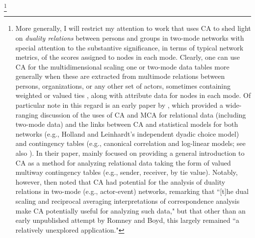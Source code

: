 \footnote{More generally, I will restrict my attention to work that uses CA to shed light on \textit{duality relations} between persons and groups in two-mode networks with special attention to the substantive significance, in terms of typical network metrics, of the scores assigned to nodes in each mode. Clearly, one can use CA for the multidimensional scaling one or two-mode data tables more generally when these are extracted from multimode relations between persons, organizations, or any other set of actors, sometimes containing weighted or valued ties \citep{ragozini2014correspondence}, along with attribute data for nodes in each mode. Of particular note in this regard is an early paper by \citet{wasserman1990correspondence}, which provided a wide-ranging discussion of the uses of CA and MCA for relational data (including two-mode data) and the links between CA and statistical models for both networks (e.g., Holland and Leinhardt's independent dyadic choice model) and contingency tables (e.g., canonical correlation and log-linear models; see also \citet{wasserman1989canonical}). In their paper, \citet{wasserman1990correspondence} mainly focused on providing a general introduction to CA as a method for analyzing relational data taking the form of valued multiway contingency tables (e.g., sender, receiver, by tie value). Notably, however, \citet[35]{wasserman1990correspondence} then noted that CA had potential for the analysis of duality relations in two-mode (e.g., actor-event) networks, remarking that ``[t]he dual scaling and reciprocal averaging interpretations of correspondence analysis make CA potentially useful for analyzing such data," but that other than an early unpublished attempt by Romney and Boyd, this largely remained ``a relatively unexplored application."}